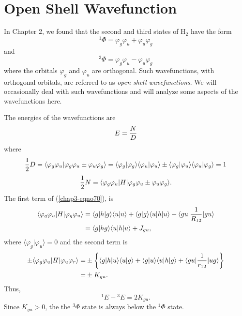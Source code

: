 \section{Open Shell Wavefunction}

In Chapter 2, we found that the second and third states of H$_2$ have the form
\begin{equation}
{^1}\Phi = \varphi_g \varphi_u + \varphi_u \varphi_g
\end{equation}
and
\begin{equation}
{^3}\Phi = \varphi_g \varphi_u - \varphi_u \varphi_g
\end{equation}
where the orbitals $\varphi_g$ and $\varphi_u$ are orthogonal.  Such
wavefunctions, with orthogonal orbitals, are referred to as \emph{open
shell wavefunctions}. We will occasionally deal with such
wavefunctions and will analyze some aspects of the wavefunctions here.

The energies of the wavefunctions are
\begin{equation}
E = {N \over D}
\label{chap3-eqno69}
\end{equation}
where
\begin{equation}
{1 \over 2} D = \langle \varphi_g \varphi_u \vert \varphi_g \varphi_u
\pm \varphi_u \varphi_g \rangle = \langle \varphi_g \vert \varphi_g
\rangle \langle \varphi_u \vert \varphi_u \rangle \pm \langle
\varphi_g \vert \varphi_u \rangle \langle \varphi_u \vert \varphi_g
\rangle = 1
\end{equation}
\begin{equation}
{1 \over 2} N = \langle \varphi_g \varphi_u \vert H \vert \varphi_g 
\varphi_u \pm \varphi_u \varphi_g \rangle .
\label{chap3-eqno70}
\end{equation}
The first term of (\ref{chap3-eqno70}), is
\begin{eqnarray}
\langle \varphi_g \varphi_u \vert H \vert \varphi_g 
\varphi_u \rangle &= \langle g \vert h \vert g \rangle \langle u \vert u 
\rangle + \langle g \vert g \rangle \langle u \vert h \vert u 
\rangle + \langle gu \vert {1 \over R_{12}} \vert gu \rangle\\
& = \langle g \vert h g \rangle \langle u \vert h \vert u \rangle + 
J_{gu},\\
\end{eqnarray}
where $\langle \varphi_g \vert \varphi_u \rangle =0$ and the second
term is
\begin{eqnarray}
\pm \langle \varphi_g \varphi_u \vert H \vert \varphi_u \varphi_r 
\rangle = & \pm \left\{ \langle g \vert h \vert u \rangle \langle u 
\vert g \rangle + \langle g \vert u \rangle \langle u \vert h \vert g 
\rangle + \langle gu \vert {1 \over r_{12}} \vert ug \rangle 
\right\}\\
= & \pm K_{gu} .\\
\end{eqnarray}
Thus,
\begin{equation}
{^1}E - {^3}E = 2K_{gu} .
\end{equation}
Since $K_{gu} > 0$, the the ${^3}\Phi$ state is always below the ${^1}\Phi$ 
state.

